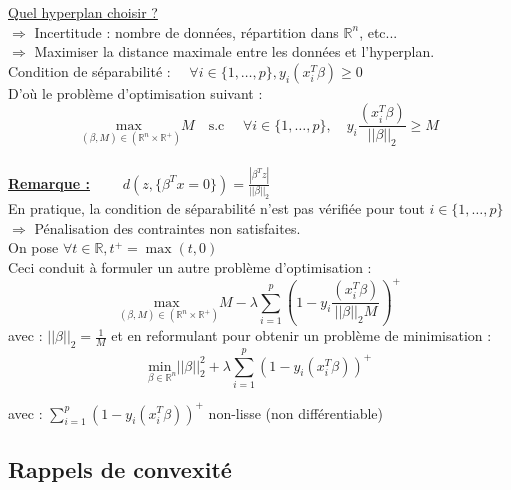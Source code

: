 \documentclass[12pt,a4paper]{article}
\begin{document}
\noindent\underline{Quel hyperplan choisir ?}\\
$\Rightarrow$ Incertitude : nombre de données, répartition dans $\mathbb{R}^n$, etc...\\
$\Rightarrow$ Maximiser la distance maximale entre les données et l'hyperplan.\\

Condition de séparabilité :
$\quad \forall i \in \{1, \dots, p\}, y_i (x_i^T \beta) \geq 0$\\

D'où le problème d'optimisation suivant :\\
\begin{equation}
    \underset{(\beta, M) \in (\mathbb{R}^n \times \mathbb{R}^+)}{\text{max }} M \quad \text{s.c } \quad \forall i \in \{1, \dots, p\}, \quad y_i \frac{(x_i^T \beta)}{||\beta||_2} \geq M
\end{equation}\\


\noindent\underline{\textbf{Remarque :}} $\qquad d(z, \{\beta^Tx=0\}) = \frac{|\beta^Tz|}{||\beta||_2}$\\
En pratique, la condition de séparabilité n'est pas vérifiée pour tout $i \in \{1, \dots, p\}$\\
$\Rightarrow$ Pénalisation des contraintes non satisfaites.\\
On pose $\forall t \in \mathbb{R}, t^+ = \max(t, 0)$\\

Ceci conduit à formuler un autre problème d'optimisation :\\
\begin{equation}
    \underset{(\beta, M) \in (\mathbb{R}^n \times \mathbb{R}^+)}{\text{max }} M - \lambda \sum_{i=1}^p (1 - y_i \frac{(x_i^T \beta)}{||\beta||_2 M})^+
\end{equation}
avec : $||\beta||_2 = \frac{1}{M}$ et en reformulant pour obtenir un problème de minimisation :\\

\begin{equation}
    \underset{\beta \in \mathbb{R}^n}{\text{min }} ||\beta||_2^2 + \lambda  \sum_{i=1}^p (1 - y_i (x_i^T \beta))^+
\end{equation}

avec : $\sum_{i=1}^p (1 - y_i (x_i^T \beta))^+$ non-lisse (non différentiable)\\



\subsection{Rappels de convexité}
\end{document}
